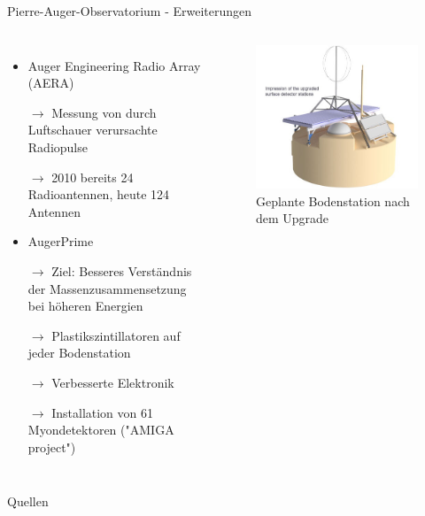 \documentclass[aspectratio=1610, professionalfonts, 9pt, hyperref={colorlinks=false}]{beamer}
\begin{document}
\begin{frame}{Pierre-Auger-Observatorium - Erweiterungen}
  \begin{columns}
      \begin{itemize}
        \setlength\itemsep{0.5em}
        \item Auger Engineering Radio Array (AERA)
        \item[$\rightarrow$] Messung von durch Luftschauer verursachte Radiopulse
        \item[$\rightarrow$] 2010 bereits 24 Radioantennen, heute 124 Antennen
        \item AugerPrime
        \item[$\rightarrow$] Ziel: Besseres Verständnis der Massenzusammensetzung bei höheren Energien
        \item[$\rightarrow$] Plastikszintillatoren auf jeder Bodenstation
        \item[$\rightarrow$] Verbesserte Elektronik
        \item[$\rightarrow$] Installation von 61 Myondetektoren ("AMIGA project")
      \end{itemize}
        \vspace*{10px}
  
      \begin{figure}
          \centering
          \includegraphics[width=\linewidth]{images/2018-09_NWO-grant_radio1.jpg}
          \caption{Geplante Bodenstation nach dem Upgrade \cite{prime}}
      \end{figure}
  \end{columns}
\end{frame}


\appendix

\begin{frame}[allowframebreaks]{Quellen}
	\printbibliography

\end{frame}
\end{document}

